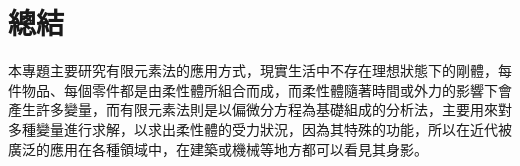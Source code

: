 \chapter{總結}
本專題主要研究有限元素法的應用方式，現實生活中不存在理想狀態下的剛體，每件物品、每個零件都是由柔性體所組合而成，而柔性體隨著時間或外力的影響下會產生許多變量，而有限元素法則是以偏微分方程為基礎組成的分析法，主要用來對多種變量進行求解，以求出柔性體的受力狀況，因為其特殊的功能，所以在近代被廣泛的應用在各種領域中，在建築或機械等地方都可以看見其身影。

\newpage
